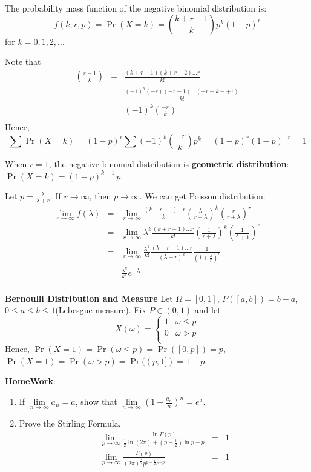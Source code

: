 \documentclass[11pt]{article}
\begin{document}
The probability mass function of the negative binomial distribution is:
\[f(k; r,p) = \Pr(X = k) = {k+r-1 \choose k} p^k (1-p)^r\]
for $k = 0, 1, 2, ...$

Note that \begin{eqnarray*}
{r-1 \choose k}&=&\frac{(k+r-1)(k+r-2)\dots r}{k!} \\
&=&\frac{(-1)^{k}(-r)(-r-1)\dots(-r-k-+1)}{k!}\\
&=&(-1)^k{-r \choose k}\\
\end{eqnarray*}
Hence, $$\sum{\Pr(X=k)}=(1-p)^r\sum{(-1)^k{-r \choose k}p^k}=(1-p)^r(1-p)^{-r}=1$$

When $r=1$, the negative binomial distribution is \textbf{geometric distribution}:$\Pr(X = k) = (1-p)^{k-1}\,p$.

Let $p=\frac{\lambda}{\lambda+r}$. If $r \rightarrow \infty$, then $p \rightarrow \infty$. We can get Poisson distribution:
\begin{eqnarray*}
\lim_{r\rightarrow\infty}f(\lambda) &=& \lim_{r\rightarrow\infty}\frac{(k+r-1)\dots r}{k!}\left(\frac{\lambda}{r+\lambda}\right)^k\left(\frac{r}{r+\lambda}\right)^r \\
&=&\lim_{r\rightarrow\infty}\lambda^k\frac{(k+r-1)\dots r}{k!}\left(\frac{1}{r+\lambda}\right)^k\left(\frac{1}{\frac{\lambda}{r}+1}\right)^r \\
&=&\lim_{r\rightarrow\infty}\frac{\lambda^k}{k!}\frac{(k+r-1)\dots r}{(\lambda+r)^k}\frac{1}{\left(1+\frac{\lambda}{r}\right)^r} \\
&=&\frac{\lambda^k}{k!}e^{-\lambda} \\
\end{eqnarray*} 

\textbf{Bernoulli Distribution and Measure}
Let $\Omega=[0, 1]$, $P([a,b])=b-a$, $0\le a\le b\le 1$(Lebesgue measure).
Fix $P \in (0,1)$ and let \[X(\omega) = \left\{\begin{array}{cc}
1 & \omega\le p \\
0 & \omega > p \\
\end{array}
\right.
\]
Hence, $\Pr(X=1)=\Pr(\omega\le p)=\Pr([0,p])=p$, $\Pr(X=1)=\Pr(\omega> p)=\Pr((p,1])=1-p$.

\textbf{HomeWork}:
\begin{enumerate}[(1)]
\item
If $\lim \limits_{n\rightarrow\infty}a_n=a$, show that $\lim \limits_{n\rightarrow\infty}\left(1+\frac{a_n}{n}\right)^n=e^{a}$.
\item
Prove the Stirling Formula.
\begin{eqnarray*}
\lim_{p\rightarrow\infty}\frac{\ln\Gamma(p)}{\frac{1}{2}\ln(2\pi)+(p-\frac{1}{2})\ln{p}-p}&=&1\\
\lim_{p\rightarrow\infty}\frac{\Gamma(p)}{(2\pi)^{\frac{1}{2}}p^{p-\frac{1}{2}}e^{-p}}&=&1
\end{eqnarray*}
\end{enumerate}
\end{document}
